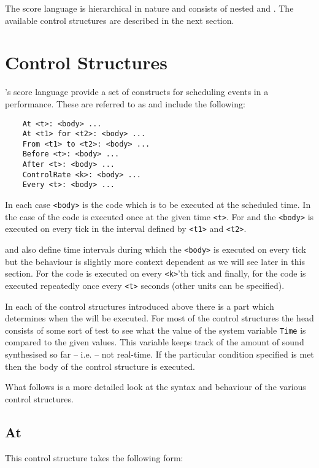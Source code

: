 The score language is hierarchical in nature and consists of nested
 and . The available
control structures are described in the next section.

\section{Control Structures}
\label{section:control_structures}
\tao's score language provide a set of constructs for scheduling events
in a performance. These are referred to as 
and include the following:

\begin{verbatim}
    At <t>: <body> ...
    At <t1> for <t2>: <body> ...
    From <t1> to <t2>: <body> ...
    Before <t>: <body> ...
    After <t>: <body> ...
    ControlRate <k>: <body> ...
    Every <t>: <body> ...
\end{verbatim}

In each case \verb|<body>| is the code which is to be executed at
the scheduled time. In the case of  the code is executed once
at the given time \verb|<t>|. For  and  the
\verb|<body>| is executed on every tick in the interval defined by
\verb|<t1>| and \verb|<t2>|.

 and  also define time intervals during which the
\verb|<body>| is executed on every tick but the behaviour is slightly more
context dependent as we will see later in this section. For
 the code is executed on every \verb|<k>|'th tick and
finally, for  the code is executed repeatedly once every
\verb|<t>| seconds (other units can be specified).

In each of the control structures introduced above there is a 
part which determines when the  will be executed. For most of
the control structures the head consists of some sort of test to see what
the value of the system variable \verb|Time| is compared to the
given values. This variable keeps track of the amount of sound synthesised
so far -- i.e.  -- not real-time.
If the particular condition specified is met then the body of the control
structure is executed.

What follows is a more detailed look at the syntax and behaviour of
the various control structures.

\subsection{At}
This control structure takes the following form:

